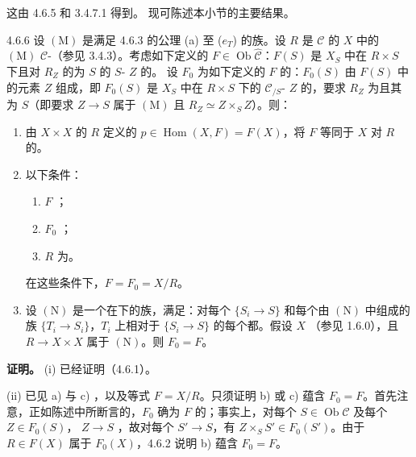 这由 4.6.5 和 3.4.7.1 得到。
现可陈述本小节的主要结果。
\begin{SGAresult}{}{4.6.6}
设 $(\mathrm M)$ 是满足 4.6.3 的公理 (a) 至 ($e_T$) 的族。设 $R$ 是 $\mathcal C$ 的 $X$ 中的 $(\mathrm M)$  $\mathcal C$-（参见 3.4.3）。考虑如下定义的 $F\in\operatorname{Ob}\widehat{\mathcal C}$：$F(S)$ 是 $X_S$ 中在 $R\times S$ 下且对 $R_Z$ 的为 $S$ 的 $S$- $Z$ 的。
设 $F_0$ 为如下定义的 $F$ 的：$F_0(S)$ 由 $F(S)$ 中的元素 $Z$ 组成，即 $F_0(S)$ 是 $X_S$ 中在 $R\times S$ 下的 $\mathcal C_{/S}$- $Z$ 的，要求 $R_Z$ 为且其为 $S$（即要求 $Z\to S$ 属于 $(\mathrm M)$ 且 $R_Z\simeq Z\times_S Z$）。则：
\begin{enumerate}
\item[(i)] 由 $X\times X$ 的 $R$ 定义的 $p\in\operatorname{Hom}(X,F)=F(X)$，将 $F$ 等同于 $X$ 对 $R$ 的。
\item[(ii)] 以下条件：
\begin{enumerate}
\item[a)] $F$ ；
\item[b)] $F_0$ ；
\item[c)] $R$ 为。
\end{enumerate}
在这些条件下，$F=F_0=X/R$。
\item[(iii)] 设 $(\mathrm N)$ 是一个在下的族，满足：对每个 $\{S_i\to S\}$ 和每个由 $(\mathrm N)$ 中组成的族 $\{T_i\to S_i\}$，$T_i$ 上相对于 $\{S_i\to S\}$ 的每个都。假设 $X$ （参见 1.6.0），且 $R\to X\times X$ 属于 $(\mathrm N)$。则 $F_0=F$。
\end{enumerate}
\end{SGAresult}
\textbf{证明。}
(i) 已经证明（4.6.1）。

(ii) 已见 a) 与 c) ，以及等式 $F=X/R$。只须证明 b) 或 c) 蕴含 $F_0=F$。首先注意，正如陈述中所断言的，$F_0$ 确为 $F$ 的；事实上，对每个 $S\in\operatorname{Ob}\mathcal C$ 及每个 $Z\in F_0(S)$， $Z\to S$ ，故对每个 $S'\to S$，有 $Z\times_S S'\in F_0(S')$。由于 $R\in F(X)$ 属于 $F_0(X)$，4.6.2 说明 b) 蕴含 $F_0=F$。

